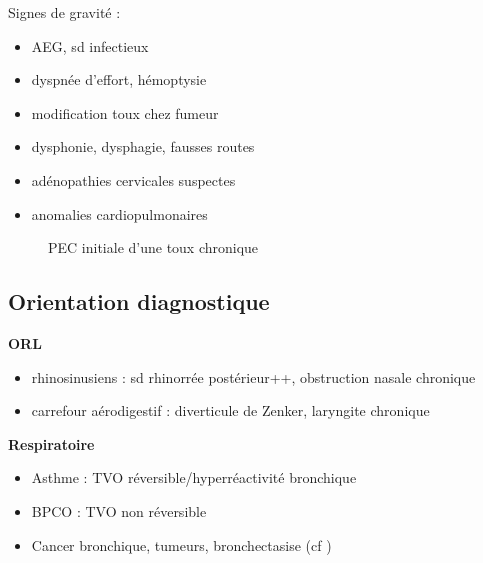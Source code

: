 \documentclass{article}
\begin{document}
Signes de gravité : 
\begin{itemize}
\item AEG, sd infectieux
\item dyspnée d'effort, hémoptysie
\item modification toux chez fumeur
\item dysphonie, dysphagie, fausses routes
\item adénopathies cervicales suspectes
\item anomalies cardiopulmonaires
\end{itemize}

\begin{figure}[htpb]
  \centering
  \caption{PEC initiale d'une toux chronique}
\end{figure}

\subsection{Orientation diagnostique}
\label{subsec:toux_orientation}
\textbf{ORL}  
\begin{itemize}
\item rhinosinusiens : sd rhinorrée postérieur++, obstruction nasale chronique
\item carrefour aérodigestif : diverticule de Zenker, laryngite chronique
\end{itemize}

\textbf{Respiratoire} 
\begin{itemize}
\item Asthme : TVO réversible/hyperréactivité bronchique
\item BPCO : TVO non réversible
\item Cancer bronchique, tumeurs, bronchectasise (cf
  )
\end{itemize}
\end{document}
